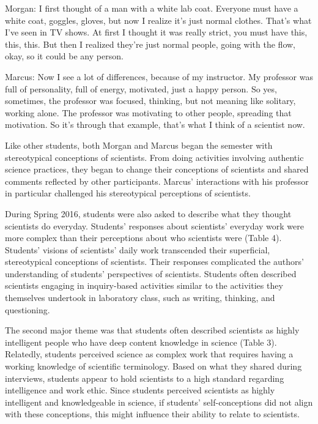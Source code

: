 \documentclass[11.5pt]{sig-alternate} %
\begin{document}
\begin{large}
Morgan: I first thought of a man with a white lab coat. Everyone must have a white coat, goggles, gloves, but now I realize it's just normal clothes. That's what I've seen in TV shows. At first I thought it was really strict, you must have this, this, this. But then I realized they're just normal people, going with the flow, okay, so it could be any person.

Marcus: Now I see a lot of differences, because of my instructor. My professor was full of personality, full of energy, motivated, just a happy person. So yes, sometimes, the professor was focused, thinking, but not meaning like solitary, working alone. The professor was motivating to other people, spreading that motivation. So it's through that example, that's what I think of a scientist now.

Like other students, both Morgan and Marcus began the semester with stereotypical conceptions of scientists. From doing activities involving authentic science practices, they began to change their conceptions of scientists and shared comments reflected by other participants. Marcus’ interactions with his professor in particular challenged his stereotypical perceptions of scientists. 

During Spring 2016, students were also asked to describe what they thought scientists do everyday. Students’ responses about scientists’ everyday work were more complex than their perceptions about who scientists were (Table 4). Students’ visions of scientists’ daily work transcended their superficial, stereotypical conceptions of scientists. Their responses complicated the authors’ understanding of students’ perspectives of scientists. Students often described scientists engaging in inquiry-based activities similar to the activities they themselves undertook in laboratory class, such as writing, thinking, and questioning. 

The second major theme was that students often described scientists as highly intelligent people who have deep content knowledge in science (Table 3). Relatedly, students perceived science as complex work that requires having a working knowledge of scientific terminology. Based on what they shared during interviews, students appear to hold scientists to a high standard regarding intelligence and work ethic. Since students perceived scientists as highly intelligent and knowledgeable in science, if students’ self-conceptions did not align with these conceptions, this might influence their ability to relate to scientists.


\end{large}
\end{document}
